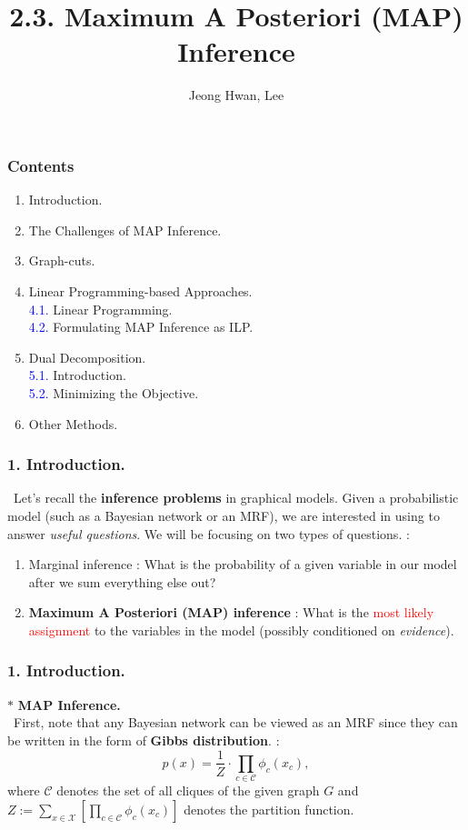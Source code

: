 \documentclass[11pt]{beamer}
\title{2.3. Maximum A Posteriori (MAP) Inference}
\author{Jeong Hwan, Lee}
\institute{KAIST Dept. of Mathematical Sciences}
\newtheorem*{pf of lemma}{\it Proof of the \normalfont \bf Lemma}
\newtheorem*{pf of claim}{\it Proof of the \normalfont \sf Claim}
\begin{document}
\frame{\titlepage}

\begin{frame}
\frametitle{Contents}

\begin{enumerate}
\item Introduction. \\
\item The Challenges of MAP Inference. \\
\item Graph-cuts. \\
\item Linear Programming-based Approaches. \\ \textcolor{blue}{4.1.} Linear Programming. \\
\textcolor{blue}{4.2.} Formulating MAP Inference as ILP. \\
\item Dual Decomposition. \\
\textcolor{blue}{5.1.} Introduction. \\
\textcolor{blue}{5.2.} Minimizing the Objective. \\
\item Other Methods.
\end{enumerate}

\end{frame}

\begin{frame}
\frametitle{1. Introduction.}
\ \indent Let's recall the \textbf{inference problems} in graphical models. Given a probabilistic model (such as a Bayesian network or an MRF), we are interested in using to answer \textit{useful questions}. We will be focusing on two types of questions. : \\

\begin{enumerate}
\item Marginal inference : What is the probability of a given variable in our model after we sum everything else out? \\
\item \textbf{Maximum A Posteriori (MAP) inference} : What is the \textcolor{red}{most likely assignment} to the variables in the model (possibly conditioned on \textit{evidence}).

\end{enumerate}

\end{frame}

\begin{frame}
\frametitle{1. Introduction.}
$\ast$ \textbf{MAP Inference.} \\
\ \indent First, note that any Bayesian network can be viewed as an MRF since they can be written in the form of \textbf{Gibbs distribution}. : 
$$ p(x) = \frac{1}{Z} \cdot \prod_{c \in \mathcal{C}} \phi_{c}(x_{c}),$$ where $\mathcal{C}$ denotes the set of all cliques of the given graph $G$ and $Z := \sum_{x \in \mathcal{X}} \left[ \prod_{c \in \mathcal{C}} \phi_{c}(x_{c}) \right]$ denotes the partition function.
\end{frame}
\end{document}
